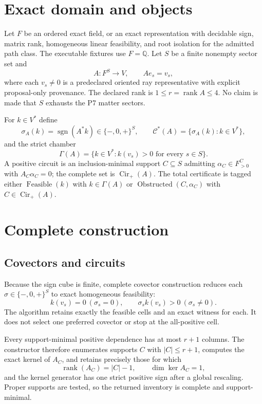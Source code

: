 \documentclass[11pt]{article}
\newcommand{\Q}{\mathbb{Q}}
\newcommand{\Cstar}{\mathcal{C}^{*}}
\newcommand{\Cirp}{\operatorname{Cir}_{+}}
\newcommand{\GammaA}{\Gamma(A)}
\begin{document}
\section{Exact domain and objects}

Let $F$ be an ordered exact field, or an exact representation with decidable
sign, matrix rank, homogeneous linear feasibility, and root isolation for the
admitted path class.  The executable fixtures use $F=\Q$.  Let $S$ be a finite
nonempty sector set and
\[
  A:F^S\longrightarrow V,\qquad A e_s=v_s,
\]
where each $v_s\ne0$ is a predeclared oriented ray representative with explicit
proposal-only provenance.  The declared rank is $1\le r=\operatorname{rank}A
\le4$.  No claim is made that $S$ exhausts the P7 matter sectors.

For $k\in V^*$ define
\[
 \sigma_A(k)=\operatorname{sgn}(A^*k)\in\{-,0,+\}^{S},\qquad
 \Cstar(A)=\{\sigma_A(k):k\in V^*\},
\]
and the strict chamber
\[
 \GammaA=\{k\in V^*:k(v_s)>0\text{ for every }s\in S\}.
\]
A positive circuit is an inclusion-minimal support $C\subseteq S$ admitting
$\alpha_C\in F^C_{>0}$ with $A_C\alpha_C=0$; the complete set is
$\Cirp(A)$.  The total certificate is tagged either
$\operatorname{Feasible}(k)$ with $k\in\GammaA$ or
$\operatorname{Obstructed}(C,\alpha_C)$ with
$C\in\Cirp(A)$.

\section{Complete construction}

\subsection{Covectors and circuits}

Because the sign cube is finite, complete covector construction reduces each
$\sigma\in\{-,0,+\}^S$ to exact homogeneous feasibility:
\[
 k(v_s)=0\ (\sigma_s=0),\qquad
 \sigma_s k(v_s)>0\ (\sigma_s\ne0).
\]
The algorithm retains exactly the feasible cells and an exact witness for each.
It does not select one preferred covector or stop at the all-positive cell.

Every support-minimal positive dependence has at most $r+1$ columns.  The
constructor therefore enumerates supports $C$ with $|C|\le r+1$, computes the
exact kernel of $A_C$, and retains precisely those for which
\[
 \operatorname{rank}(A_C)=|C|-1,\qquad
 \dim\ker A_C=1,
\]
and the kernel generator has one strict positive sign after a global
rescaling.  Proper supports are tested, so the returned inventory is complete
and support-minimal.
\end{document}
